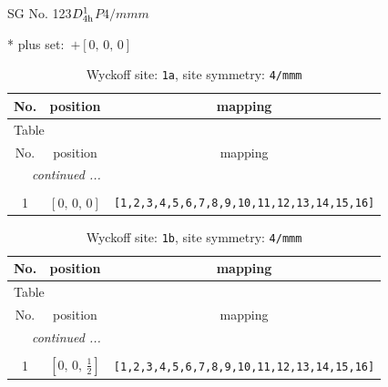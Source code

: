 \documentclass[fleqn,8pt]{jsarticle}
\begin{document}
\setcounter{MaxMatrixCols}{32}

\renewcommand{\tablename}{Table~}
\renewcommand{\figurename}{Figure~}
\begin{center}
\LARGE
SG No. 123\quad$D_{\rm 4h}^{1}$\quad$P4/mmm$\quad[ tetragonal ]
\end{center}
* plus set:\,\,\,$+\left[ 0,\, 0,\, 0 \right]$
\renewcommand{\arraystretch}{1.2}
\begin{longtable}{ccc}
\caption{Wyckoff site: {\tt 1a}, site symmetry: {\tt 4/mmm}}
 \\
 \hline \hline
No. & position & mapping \\ \hline \endfirsthead

\multicolumn{2}{l}{\tablename\ \thetable{}} \\
 \hline \hline
No. & position & mapping \\ \hline \endhead

 \hline \hline
\multicolumn{2}{r}{\footnotesize\it continued ...} \\ \endfoot

 \hline \hline
\multicolumn{2}{r}{} \\ \endlastfoot

1 & $\left[ 0,\, 0,\, 0 \right]$ & {\tt [1,2,3,4,5,6,7,8,9,10,11,12,13,14,15,16]} \\
\end{longtable}
\renewcommand{\arraystretch}{1.2}
\begin{longtable}{ccc}
\caption{Wyckoff site: {\tt 1b}, site symmetry: {\tt 4/mmm}}
 \\
 \hline \hline
No. & position & mapping \\ \hline \endfirsthead

\multicolumn{2}{l}{\tablename\ \thetable{}} \\
 \hline \hline
No. & position & mapping \\ \hline \endhead

 \hline \hline
\multicolumn{2}{r}{\footnotesize\it continued ...} \\ \endfoot

 \hline \hline
\multicolumn{2}{r}{} \\ \endlastfoot

1 & $\left[ 0,\, 0,\, \frac{1}{2} \right]$ & {\tt [1,2,3,4,5,6,7,8,9,10,11,12,13,14,15,16]} \\
\end{longtable}
\renewcommand{\arraystretch}{1.2}
\end{document}
